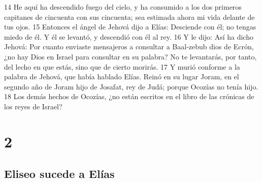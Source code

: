 14 He aquí ha descendido fuego del cielo, y ha consumido a los dos primeros capitanes de cincuenta con sus cincuenta; sea estimada ahora mi vida delante de tus ojos.
15 Entonces el ángel de Jehová dijo a Elías: Desciende con él; no tengas miedo de él. Y él se levantó, y descendió con él al rey.
16 Y le dijo: Así ha dicho Jehová: Por cuanto enviaste mensajeros a consultar a Baal-zebub dios de Ecrón, ¿no hay Dios en Israel para consultar en su palabra? No te levantarás, por tanto, del lecho en que estás, sino que de cierto morirás.
17 Y murió conforme a la palabra de Jehová, que había hablado Elías. Reinó en su lugar Joram, en el segundo año de Joram hijo de Josafat, rey de Judá; porque Ocozías no tenía hijo.
18 Los demás hechos de Ocozías, ¿no están escritos en el libro de las crónicas de los reyes de Israel?

\chapter{2}

\section*{Eliseo sucede a Elías}


